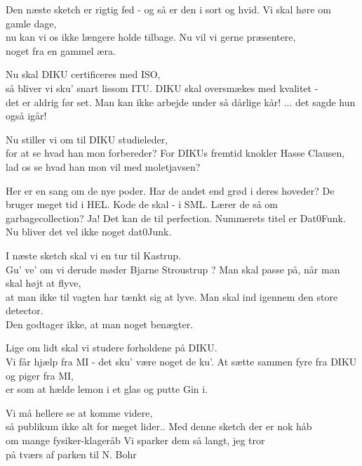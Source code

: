 \documentclass[a4paper,11pt]{article}
\begin{document}
\begin{sketch}
 Den næste sketch er rigtig fed
 - og så er den i sort og hvid.
 Vi skal høre om gamle dage, \\
        nu kan vi os ikke længere holde tilbage.
 Nu vil vi gerne præsentere, \\
        noget fra en gammel æra.


 Nu skal DIKU certificeres med ISO, \\
        så bliver vi sku' snart lissom ITU.
 DIKU skal oversmækes med kvalitet - \\
        det er aldrig før set.
 Man kan ikke arbejde under så dårlige kår!
 ... det sagde hun også igår!

 Nu stiller vi om til DIKU studieleder, \\
for at se hvad han mon forbereder?
 For DIKUs fremtid knokler Hasse Clausen, \\
lad os se hvad han mon vil med moletjavsen?




 Her er en sang om de nye poder.
 Har de andet end grød i deres hoveder?
 De bruger meget tid i HEL.
 Kode de skal - i SML.
 Lærer de så om garbagecollection?
 Ja! Det kan de til perfection.
 Nummerets titel er Dat0Funk.
 Nu bliver det vel ikke noget dat0Junk.


 I næste sketch skal vi en tur til Kastrup. \\
        Gu' ve' om vi derude møder Bjarne Stroustrup ?
 Man skal passe på, når man skal højt at flyve, \\
        at man ikke til vagten har tænkt sig at lyve.
 Man skal ind igennem den store detector. \\
        Den godtager ikke, at man noget benægter.


 Lige om lidt skal vi studere forholdene på DIKU. \\
        Vi får hjælp fra MI - det sku' være noget de ku'.
 At sætte sammen fyre fra DIKU og piger fra MI, \\
        er som at hælde lemon i et glas og putte Gin i.


 Vi må hellere se at komme videre, \\
så publikum ikke alt for meget lider..
 Med denne sketch der er nok håb \\
om mange fysiker-klageråb
 Vi sparker dem så langt, jeg tror \\
på tværs af parken til N. Bohr


\end{sketch}
\end{document}
